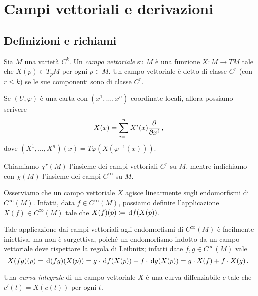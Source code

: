 \chapter{Campi vettoriali e derivazioni}

\section{Definizioni e richiami}

\begin{definition} 
	Sia $M$ una varietà $C^k$. Un \emph{campo vettoriale} su $M$ è una funzione $X:M\to TM$ tale che $X(p)\in T_pM$ per ogni $p\in M$. Un campo vettoriale è detto di classe $C^r$ (con $r\le k$) se le sue componenti sono di classe $C^r$.
\end{definition}

Se $(U,\varphi)$ è una carta con $(x^1,\dots,x^n)$ coordinate locali, allora possiamo scrivere
\begin{equation*}
	X(x)=\sum_{i=1}^nX^i(x)\frac{\partial}{\partial x^i}\, \text{, }
\end{equation*}
dove $(X^1,\dots,X^n)(x)=T\varphi(X(\varphi^{-1}(x)))$.

 
Chiamiamo $\chi^r(M)$ l'insieme dei campi vettoriali $C^r$ su $M$, mentre indichiamo con $\chi(M)$ l'insieme dei campi $C^\infty$ su $M$.
 

\begin{remark} \label{nota:CampiVettEndomorfismiCinfinito}
	Osserviamo che un campo vettoriale $X$ agisce linearmente sugli endomorfismi di $C^\infty(M)$. Infatti, data $f\in C^\infty(M)$, possiamo definire l'applicazione $X(f)\in C^\infty(M)$ tale che $X(f)(p)\coloneqq \,\mathrm d f(X(p))$.
	
	Tale applicazione dai campi vettoriali agli endomorfismi di $C^\infty(M)$ è facilmente iniettiva, ma non è surgettiva, poiché un endomorfismo indotto da un campo vettoriale deve rispettare la regola di Leibnitz; infatti date $f,g \in C^\infty(M)$ vale
	\begin{equation*}
		X(fg) (p) = \,\mathrm d (f g) (X(p)) = g \cdot \,\mathrm d f (X(p)) + f \cdot \,\mathrm d g(X(p)) = g \cdot X(f) + f \cdot X(g) \, \text{. } 
	\end{equation*}

\end{remark}

 
\begin{definition} 
	Una \emph{curva integrale} di un campo vettoriale $X$ è una curva diffenziabile $c$ tale che $c'(t)=X(c(t))$ per ogni $t$.
\end{definition}

